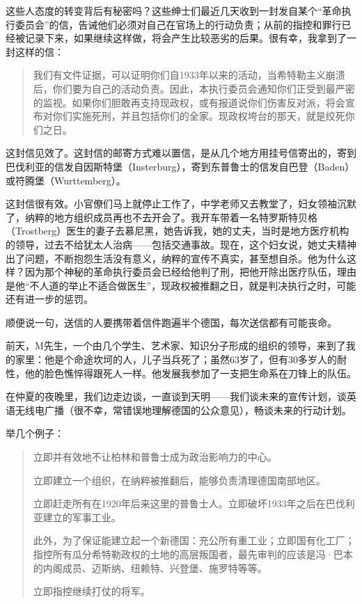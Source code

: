 \documentclass[UTF8]{ctexart}
\begin{document}
这些人态度的转变背后有秘密吗？这些绅士们最近几天收到一封发自某个“革命执行委员会”的信，告诫他们必须对自己在官场上的行动负责；从前的指控和罪行已经被记录下来，如果继续这样做，将会产生比较恶劣的后果。很有幸，我拿到了一封这样的信：

\begin{quote}
我们有文件证据，可以证明你们自1933年以来的活动，当希特勒主义崩溃后，你们要为自己的活动负责。因此，本执行委员会通知你们正受到最严密的监视。如果你们胆敢再支持现政权，或有报道说你们伤害反对派，将会宣布对你们实施死刑，并且包括你们的全家。现政权垮台的那天，就是绞死你们之日。
\end{quote}

这封信见效了。这封信的邮寄方式难以置信，是从几个地方用挂号信寄出的，寄到巴伐利亚的信发自因斯特堡（Insterburg），寄到东普鲁士的信发自巴登（Baden）或符腾堡（Wurttemberg）。

这封信很有效。小官僚们马上就停止工作了，中学老师又去教堂了，妇女领袖沉默了，纳粹的地方组织成员再也不去开会了。我开车带着一名特罗斯特贝格（Trostberg）医生的妻子去慕尼黑，她告诉我，她的丈夫，当时是地方医疗机构的领导，过去不给犹太人治病——包括交通事故。现在，这个妇女说，她丈夫精神出了问题，不断抱怨生活没有意义，纳粹的宣传不真实，甚至想自杀。他为什么这样？因为那个神秘的革命执行委员会已经给他判了刑，把他开除出医疗队伍，理由是他“不人道的举止不适合做医生”，现政权被推翻之日，就是判决执行之时，可能还有进一步的惩罚。

顺便说一句，送信的人要携带着信件跑遍半个德国，每次送信都有可能丧命。

前天，M先生，一个由几个学生、艺术家、知识分子形成的组织的领导，来到了我的家里：他是个命途坎坷的人，儿子当兵死了；虽然63岁了，但有30多岁人的耐性，他的脸色憔悴得跟死人一样。他发展我参加了一支把生命系在刀锋上的队伍。

在仲夏的夜晚里，我们边走边谈，一直谈到天明——我们谈未来的宣传计划，谈英语无线电广播（很不幸，常错误地理解德国的公众意见），畅谈未来的行动计划。

举几个例子：

\begin{quote}
立即并有效地不让柏林和普鲁士成为政治影响力的中心。

立即建立一个组织，在纳粹被推翻后，能够负责清理德国南部地区。

立即赶走所有在1920年后来这里的普鲁士人。立即破坏1933年之后在巴伐利亚建立的军事工业。

此外，为了保证能建立起一个新德国：充公所有重工业；立即国有化工厂；指控所有瓜分希特勒政权的土地的高层叛国者，最先审判的应该是冯·巴本的内阁成员、迈斯纳、纽赖特、兴登堡、施罗特等等。

立即指控继续打仗的将军。
\end{quote}
\end{document}
